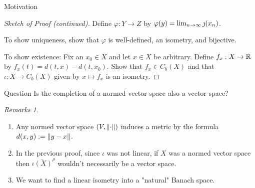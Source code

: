 \documentclass[10pt]{beamer}
\theoremstyle{plain} %
\theoremstyle{remark} %
\newtheorem*{remarks}{Remarks}
\begin{document}
\begin{frame}{Motivation}
    \begin{proof}[Sketch of Proof (continued)]
        \noindent Define $\varphi:Y \rightarrow Z$ by $\varphi(y) = \lim_{n \rightarrow \infty} \jmath(x_n)$. \nl

        \noindent To show uniqueness, show that $\varphi$ is well-defined, an isometry, and bijective. \nl
        
        \noindent To show existence: Fix an $x_0 \in X$ and let $x \in X$ be arbitrary. Define $f_x:X \rightarrow \mathbb{R}$ by $f_x(t) = d(t,x) - d(t,x_0)$. Show that $f_x \in C_b(X)$ and that $\iota:X \rightarrow C_b(X)$ given by $x \mapsto f_x$ is an isometry.
    \end{proof}
\end{frame}

\begin{frame}{Question}
    \pause
    Is the completion of a normed vector space also a vector space?
    \vspace{10pt}
    \pause
    \begin{remarks}
        \begin{enumerate}[label = (\arabic*),itemsep=10pt,topsep=5pt]
            \item Any normed vector space $(V,\left\lVert \cdot \right\rVert)$ induces a metric by the formula $d(x,y) := \left\lVert y-x \right\rVert$.
            \item In the previous proof, since $\iota$ was not linear, if $X$ was a normed vector space then $\overline{\iota(X)}^\rho$ wouldn't necessarily be a vector space.
            \item We want to find a linear isometry into a "natural" Banach space.
        \end{enumerate}
    \end{remarks}
    \end{frame}
\end{document}
